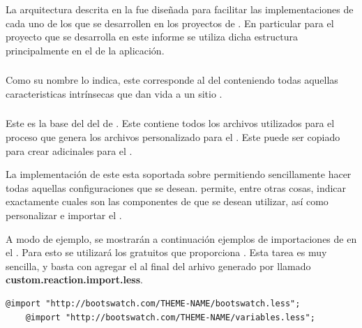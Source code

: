 La arquitectura descrita en la  fue diseñada para facilitar las implementaciones de cada uno de los \packagesAS que se desarrollen en los proyectos de \meteorNAME. En particular para el proyecto que se desarrolla en este informe se utiliza dicha estructura principalmente en el \packagesAS \coreAS de la aplicación.

\subsubsection{\rtcomCorePCKG}

Como su nombre lo indica, este \packagesAS corresponde al \coreAS del \frameworkPC conteniendo todas aquellas caracteristicas intrínsecas que dan vida a un sitio \ecommerceCOM. 

\subsubsection{\rtcomCoreThemePCKG}

Este \packagesAS es la base del \bootstrap \themeCPT del \frameworkPC de \ecommerceCOM. Este contiene todos los archivos \lessNAME utilizados para el proceso que genera los archivos \lessNAME personalizado para el \frameworkPC. Este \packagesAS puede ser copiado para crear \themeCPT adicinales para el \frameworkPC \ecommerceCOM.

La implementación de este \packagesAS esta soportada sobre \bootstrapPackage permitiendo sencillamente hacer todas aquellas configuraciones que se desean. \bootstrapPackage permite, entre otras cosas, indicar exactamente cuales son las componentes de \bootstrapNAME que se desean utilizar, así como personalizar e importar el \themeCPT.

A modo de ejemplo, se mostrarán a continuación ejemplos de importaciones de \themesCPT en el \frameworkPC. Para esto se utilizará los \themesCPT gratuitos que proporciona \bootswatchNAME. Esta tarea es muy sencilla, y basta con agregar el  al final del arhivo generado por \bootstrapPackage llamado \textbf{custom.reaction.import.less}.

%
\medskip
\begin{lstlisting}[caption= Código genérico para importar \themesCPT desde \bootswatchNAME, label=source:less:generic_bootswatch_theme]
	@import "http://bootswatch.com/THEME-NAME/bootswatch.less";
	@import "http://bootswatch.com/THEME-NAME/variables.less";
\end{lstlisting}

